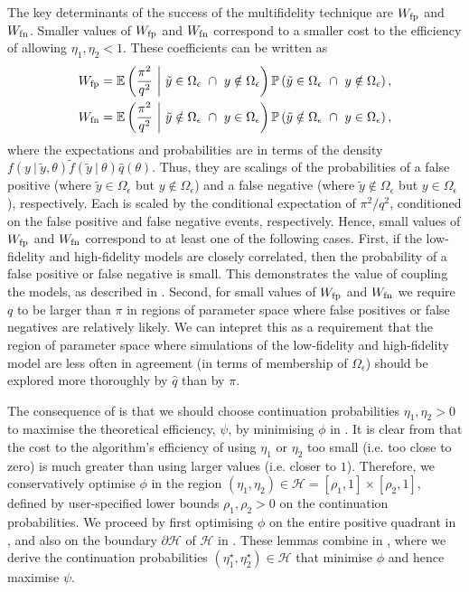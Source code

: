 \documentclass[review,demo]{siamonline190516}
\begin{document}
The key determinants of the success of the multifidelity technique are $W_{\mathrm{fp}}$ and $W_{\mathrm{fn}}$.
Smaller values of $W_{\mathrm{fp}}$ and $W_{\mathrm{fn}}$ correspond to a smaller cost to the efficiency of allowing $\eta_1,\eta_2<1$.
These coefficients can be written as
\begin{align*}
 W_{\mathrm{fp}} 
 &= 
 \mathbb E \left( \frac{\pi^2}{q^2} ~\bigg|~ \tilde y \in \Omega_\epsilon ~\cap~ y \notin \Omega_\epsilon \right) \mathbb P \left( \tilde y \in \Omega_\epsilon ~\cap~ y \notin \Omega_\epsilon \right),
 \\
 W_{\mathrm{fn}} 
 &= 
 \mathbb E \left( \frac{\pi^2}{q^2} ~\bigg|~ \tilde y \notin \Omega_\epsilon ~\cap~ y \in \Omega_\epsilon \right) \mathbb P \left( \tilde y \notin \Omega_\epsilon ~\cap~ y \in \Omega_\epsilon \right),
\end{align*}
where the expectations and probabilities are in terms of the density $f(y~|~\tilde y, \theta) \tilde f(\tilde y~|~\theta) \hat q(\theta)$.
Thus, they are scalings of the probabilities of a false positive (where $\tilde y \in \Omega_\epsilon$ but $y \notin \Omega_\epsilon$) and a false negative (where $\tilde y \notin \Omega_\epsilon$ but $y \in \Omega_\epsilon$), respectively.
Each is scaled by the conditional expectation of $\pi^2 / q^2$, conditioned on the false positive and false negative events, respectively.
Hence, small values of $W_{\mathrm{fp}}$ and $W_{\mathrm{fn}}$ correspond to at least one of the following cases.
First, if the low-fidelity and high-fidelity models are closely correlated, then the probability of a false positive or false negative is small.
This demonstrates the value of coupling the models, as described in .
Second, for small values of $W_{\mathrm{fp}}$ and $W_{\mathrm{fn}}$ we require $q$ to be larger than $\pi$ in regions of parameter space where false positives or false negatives are relatively likely.
We can intepret this as a requirement that the region of parameter space where simulations of the low-fidelity and high-fidelity model are less often in agreement (in terms of membership of $\Omega_\epsilon$) should be explored more thoroughly by $\hat q$ than by $\pi$.

The consequence of  is that we should choose continuation probabilities $\eta_1,\eta_2>0$ to maximise the theoretical efficiency, $\psi$, by minimising $\phi$ in .
It is clear from  that the cost to the algorithm's efficiency of using $\eta_1$ or $\eta_2$ too small (i.e. too close to zero) is much greater than using larger values (i.e. closer to $1$).
Therefore, we conservatively optimise $\phi$ in the region $(\eta_1,\eta_2) \in \mathcal H = [\rho_1,1] \times [\rho_2, 1]$, defined by user-specified lower bounds $\rho_1, \rho_2 > 0$ on the continuation probabilities.
We proceed by first optimising $\phi$ on the entire positive quadrant in , and also on the boundary $\partial \mathcal H$ of $\mathcal H$ in . 
These lemmas combine in , where we derive the continuation probabilities $(\eta_1^\star, \eta_2^\star) \in \mathcal H$ that minimise $\phi$ and hence maximise $\psi$.
\end{document}
